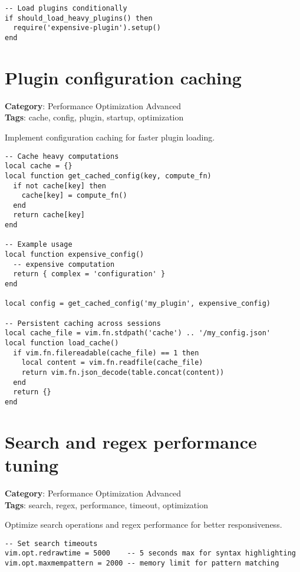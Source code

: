 {{{{{{{{{{\begin{Exa*}{}
\begin{Verbatim}[fontsize=\footnotesize, breaklines, breakanywhere]
-- Load plugins conditionally
if should_load_heavy_plugins() then
  require('expensive-plugin').setup()
end
\end{Verbatim}
\end{Exa*}

\section{Plugin configuration caching}

\textbf{Category}: Performance Optimization Advanced\\ \textbf{Tags}: cache, config, plugin, startup, optimization
\vspace{0.5cm}

Implement configuration caching for faster plugin loading.

\begin{Exa*}{}
\begin{Verbatim}[fontsize=\footnotesize, breaklines, breakanywhere]
-- Cache heavy computations
local cache = {}
local function get_cached_config(key, compute_fn)
  if not cache[key] then
    cache[key] = compute_fn()
  end
  return cache[key]
end

-- Example usage
local function expensive_config()
  -- expensive computation
  return { complex = 'configuration' }
end

local config = get_cached_config('my_plugin', expensive_config)

-- Persistent caching across sessions
local cache_file = vim.fn.stdpath('cache') .. '/my_config.json'
local function load_cache()
  if vim.fn.filereadable(cache_file) == 1 then
    local content = vim.fn.readfile(cache_file)
    return vim.fn.json_decode(table.concat(content))
  end
  return {}
end
\end{Verbatim}
\end{Exa*}

\section{Search and regex performance tuning}

\textbf{Category}: Performance Optimization Advanced\\ \textbf{Tags}: search, regex, performance, timeout, optimization
\vspace{0.5cm}

Optimize search operations and regex performance for better responsiveness.

\begin{Exa*}{}
\begin{Verbatim}[fontsize=\footnotesize, breaklines, breakanywhere]
-- Set search timeouts
vim.opt.redrawtime = 5000    -- 5 seconds max for syntax highlighting
vim.opt.maxmempattern = 2000 -- memory limit for pattern matching


\end{Verbatim}
\end{Exa*}}}}}}}}}}}
